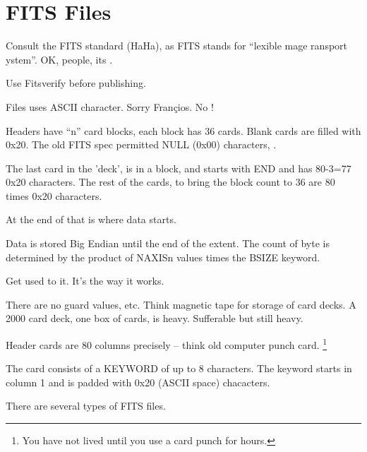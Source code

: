 
\renewcommand{\footerfilename}{FITSFiles.tex}

\section{FITS Files} \label{sec:FITSFiles}

Consult the FITS standard \cite{FITSStandard-1,FITSBirthday,NOAO_FITS} (HaHa), as FITS stands for ``lexible
mage ransport ystem''.  OK, people, its
. 

Use Fitsverify \cite{fitsverify-1} before publishing.

Files uses ASCII character. Sorry Fran\c{c}ios. No !

Headers have ``n'' card blocks, each block has 36 cards. Blank cards
are filled with 0x20. The old FITS spec permitted NULL (0x00)
characters, .

The last card in the 'deck', is in a block, and starts with END and
has 80-3=77 0x20 characters.  The rest of the cards, to bring the
block count to 36 are 80 times 0x20 characters.

At the end of that is where data starts.

Data is stored Big Endian until the end of the extent. The count of byte
is determined by the product of NAXISn values times the BSIZE keyword.

Get used to it. It's the way it works.

There are no guard values, etc. Think magnetic tape for storage of card decks.
A 2000 card deck, one box of cards, is heavy. Sufferable but still heavy.

Header cards are 80 columns precisely -- think old computer punch card. \footnote{You have
not lived until you use a card punch for hours.}

The card consists of a KEYWORD of up to 8 characters. The keyword starts in column
1 and is padded with 0x20 (ASCII space) chacacters.



There are several types of FITS files.

